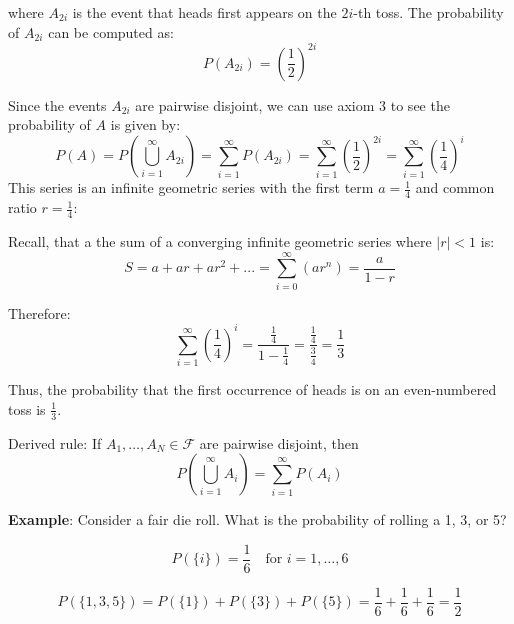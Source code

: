 \documentclass{article}
\begin{document}
where \( A_{2i} \) is the event that heads first appears on the \( 2i \)-th toss. The probability of \( A_{2i} \) can be computed as:
\[
P(A_{2i}) = \left(\frac{1}{2}\right)^{2i}
\]

Since the events \( A_{2i} \) are pairwise disjoint, we can use axiom 3 to see the probability of \( A \) is given by:
\[
P(A) = P\left(\bigcup_{i=1}^{\infty} A_{2i}\right)
= \sum_{i=1}^{\infty} P(A_{2i}) 
= \sum_{i=1}^{\infty} \left(\frac{1}{2}\right)^{2i} = \sum_{i=1}^{\infty} \left(\frac{1}{4}\right)^{i}
\]
This series is an infinite geometric series with the first term \( a = \frac{1}{4} \) and common ratio \( r = \frac{1}{4} \): 

Recall, that a the sum of a converging infinite geometric series where \(|r| < 1\) is:
\[
S = a+ar+ar^2+... = \sum_{i=0}^{\infty} \left(ar^n\right) = \frac{a}{1 - r}
\]

Therefore:
\[
\sum_{i=1}^{\infty} \left(\frac{1}{4}\right)^i = \frac{\frac{1}{4}}{1 - \frac{1}{4}} = \frac{\frac{1}{4}}{\frac{3}{4}} = \frac{1}{3}
\]

Thus, the probability that the first occurrence of heads is on an even-numbered toss is \( \boxed{\frac{1}{3}} \).


Derived rule: If \( A_1, \dots, A_N \in \mathcal{F} \) are pairwise disjoint, then 
\[
P\left(\bigcup_{i=1}^{\infty} A_i\right) = \sum_{i=1}^{\infty} P(A_i)
\]

\textbf{Example}: Consider a fair die roll. What is the probability of rolling a 1, 3, or 5?

\[
P(\{i\}) = \frac{1}{6} \quad \text{for } i = 1, \dots, 6
\]

\[
P(\{1, 3, 5\}) = P(\{1\}) + P(\{3\}) + P(\{5\}) = \frac{1}{6} + \frac{1}{6} + \frac{1}{6} = \frac{1}{2}
\]
\end{document}
